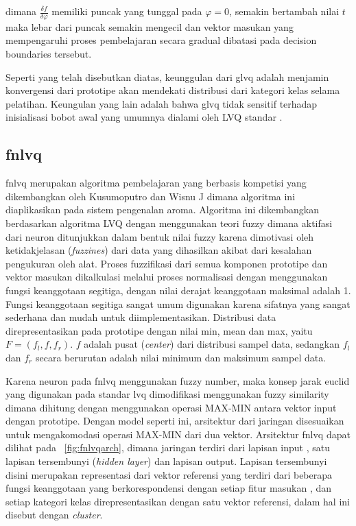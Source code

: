 \noindent dimana $\frac{\delta f}{\delta \varphi}$ memiliki puncak yang
tunggal pada $\varphi=0$, semakin bertambah nilai $t$ maka lebar dari puncak
semakin mengecil dan vektor masukan yang mempengaruhi proses pembelajaran secara
gradual dibatasi pada decision boundaries tersebut.
 
Seperti yang telah disebutkan diatas, keunggulan dari \gls{glvq} adalah menjamin
konvergensi dari prototipe akan mendekati distribusi dari kategori kelas selama
pelatihan. Keungulan yang lain adalah bahwa \gls{glvq} tidak sensitif terhadap
inisialisasi bobot awal yang umumnya dialami oleh LVQ standar \cite{Sato:1999}. 

 
\subsection{\Gls{fnlvq}}

\Gls{fnlvq} merupakan algoritma pembelajaran yang berbasis kompetisi yang
dikembangkan oleh Kusumoputro dan Wisnu J \cite{Kusumoputro:2002} dimana
algoritma ini diaplikasikan pada sistem pengenalan aroma.  Algoritma ini dikembangkan
berdasarkan algoritma LVQ dengan menggunakan teori fuzzy dimana aktifasi
dari neuron ditunjukkan dalam bentuk nilai fuzzy karena dimotivasi
oleh ketidakjelasan (\emph{fuzzines}) dari data yang dihasilkan akibat dari
kesalahan pengukuran oleh alat. Proses fuzzifikasi dari semua komponen prototipe
dan vektor masukan dikalkulasi melalui proses normalisasi dengan menggunakan
fungsi keanggotaan segitiga, dengan nilai derajat keanggotaan maksimal adalah 1.
Fungsi keanggotaan segitiga sangat umum digunakan karena sifatnya yang sangat
sederhana dan mudah untuk diimplementasikan. Distribusi data direpresentasikan
pada prototipe dengan nilai min, mean dan max, yaitu $F = (f_l, f, f_r)$. $f$
adalah pusat (\emph{center}) dari distribusi sampel data, sedangkan $f_l$ dan
$f_r$ secara berurutan adalah nilai minimum dan maksimum sampel data. 

Karena neuron pada \gls{fnlvq} menggunakan fuzzy number, maka konsep jarak
euclid yang digunakan pada standar \gls{lvq} dimodifikasi menggunakan fuzzy
similarity dimana dihitung dengan menggunakan operasi MAX-MIN antara vektor
input dengan prototipe. Dengan model seperti ini, arsitektur dari jaringan
disesuaikan untuk mengakomodasi operasi MAX-MIN dari dua vektor. Arsitektur
\gls{fnlvq} dapat dilihat pada \pic~\ref{fig:fnlvqarch}, dimana jaringan terdiri
dari lapisan input , satu lapisan tersembunyi (\emph{hidden layer}) dan lapisan
output. Lapisan tersembunyi disini merupakan representasi dari vektor referensi
yang terdiri dari beberapa fungsi keanggotaan yang berkorespondensi dengan
setiap fitur masukan , dan setiap kategori  kelas direpresentasikan dengan satu
vektor referensi, dalam hal ini disebut dengan \emph{cluster}.

